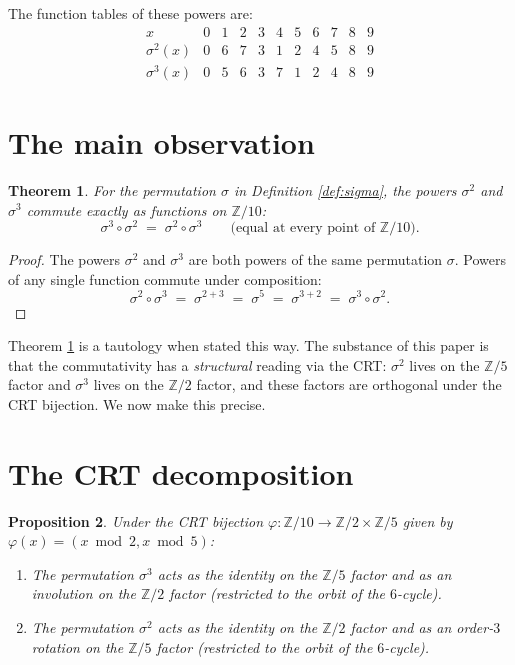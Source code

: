 \documentclass[11pt]{article}
\theoremstyle{plain}
\newtheorem{theorem}{Theorem}
\newtheorem{proposition}[theorem]{Proposition}
\theoremstyle{definition}
\theoremstyle{remark}
\begin{document}
The function tables of these powers are:
\[
\begin{array}{c|cccccccccc}
x & 0 & 1 & 2 & 3 & 4 & 5 & 6 & 7 & 8 & 9 \\
\hline
\sigma^2(x) & 0 & 6 & 7 & 3 & 1 & 2 & 4 & 5 & 8 & 9 \\
\sigma^3(x) & 0 & 5 & 6 & 3 & 7 & 1 & 2 & 4 & 8 & 9
\end{array}
\]

\section{The main observation}

\begin{theorem}\label{thm:main}
For the permutation $\sigma$ in Definition \ref{def:sigma}, the powers $\sigma^2$ and $\sigma^3$ commute exactly as functions on $\mathbb{Z}/10$:
\[
\sigma^3 \circ \sigma^2 \;=\; \sigma^2 \circ \sigma^3
\qquad \text{(equal at every point of $\mathbb{Z}/10$).}
\]
\end{theorem}

\begin{proof}
The powers $\sigma^2$ and $\sigma^3$ are both powers of the same permutation $\sigma$. Powers of any single function commute under composition:
\[
\sigma^2 \circ \sigma^3 \;=\; \sigma^{2+3} \;=\; \sigma^5 \;=\; \sigma^{3+2} \;=\; \sigma^3 \circ \sigma^2.
\]
\end{proof}

Theorem \ref{thm:main} is a tautology when stated this way. The substance of this paper is that the commutativity has a \emph{structural} reading via the CRT: $\sigma^2$ lives on the $\mathbb{Z}/5$ factor and $\sigma^3$ lives on the $\mathbb{Z}/2$ factor, and these factors are orthogonal under the CRT bijection. We now make this precise.

\section{The CRT decomposition}

\begin{proposition}\label{prop:proj}
Under the CRT bijection $\varphi : \mathbb{Z}/10 \to \mathbb{Z}/2 \times \mathbb{Z}/5$ given by $\varphi(x) = (x \bmod 2, x \bmod 5)$:
\begin{enumerate}[label=(\alph*)]
\item The permutation $\sigma^3$ acts as the identity on the $\mathbb{Z}/5$ factor and as an involution on the $\mathbb{Z}/2$ factor (restricted to the orbit of the $6$-cycle).
\item The permutation $\sigma^2$ acts as the identity on the $\mathbb{Z}/2$ factor and as an order-$3$ rotation on the $\mathbb{Z}/5$ factor (restricted to the orbit of the $6$-cycle).
\end{enumerate}
\end{proposition}
\end{document}
